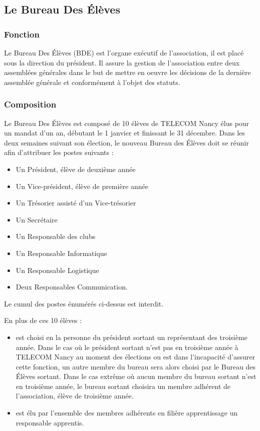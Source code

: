 \documentclass{article}
\begin{document}
		\subsection{Le Bureau Des Élèves}
		\label{ssec:bde}
			\subsubsection{Fonction}
				Le Bureau Des Élèves (BDE) est l'organe exécutif de l'association, il
				est placé sous la direction du président. Il assure la gestion de
				l'association entre deux assemblées générales dans le but de mettre
				en oeuvre les décisions de la dernière assemblée générale et
				conformément à l'objet des statuts.

			\subsubsection{Composition}
				Le Bureau Des Élèves est composé de 10 élèves de TELECOM Nancy élus
				pour un mandat d’un an, débutant le 1 janvier et finissant le
				31 décembre. Dans les deux semaines suivant son élection, le nouveau
				Bureau des Élèves doit se réunir afin d'attribuer les postes suivants
				:
				\begin{itemize}
					\item Un Président, élève de deuxième année
					\item Un Vice-président, élève de première année
					\item Un Trésorier assisté d’un Vice-trésorier
					\item Un Secrétaire
					\item Un Responsable des clubs
					\item Un Responsable Informatique
					\item Un Responsable Logistique
					\item Deux Responsables Communication.
				\end{itemize}

				Le cumul des postes énumérés ci-dessus est interdit.

				En plus de ces 10 élèves :
				\begin{itemize}
					\item est choisi en la personne du président sortant un
						représentant des troisième année. Dans le cas où le président
						sortant n’est pas en troisième année à TELECOM Nancy au
						moment des élections ou est dans l'incapacité d'assurer
						cette fonction, un autre membre du bureau sera alors
						choisi par le Bureau des Élèves sortant. Dans le cas
						extrême où aucun membre du bureau sortant n’est en
						troisième année, le bureau sortant choisira un membre
						adhérent de l'association, élève de troisième année.
					\item est élu par l’ensemble des membres adhérents en filière
						apprentissage un responsable apprentis.
				\end{itemize}
\end{document}
